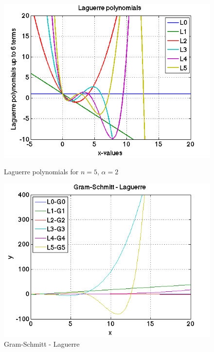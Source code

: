 \documentclass{article}
\begin{document}
\begin{figure}[h]
\centering
	\begin{minipage}[c][][b]{0.45\linewidth}
		\begin{center}
		\includegraphics[scale=0.35]{Matlab/Laguerre/Graphs/RecursivePolynomials.png}
		\end{center}
		\caption[b]{Laguerre polynomials for $n = 5$, $\alpha = 2$}
		\label{recursivepolynomials}
	\end{minipage}
\quad\quad\quad\quad
	\begin{minipage}[c][][b]{0.45\linewidth}
		\begin{center}
		\includegraphics[scale=0.35]{Matlab/Laguerre/Graphs/G-Lbefore.png}  
		\end{center}
		\caption[b]{Gram-Schmitt - Laguerre}
		\label{G-Lbefore}
	\end{minipage}

\end{figure}
\end{document}

